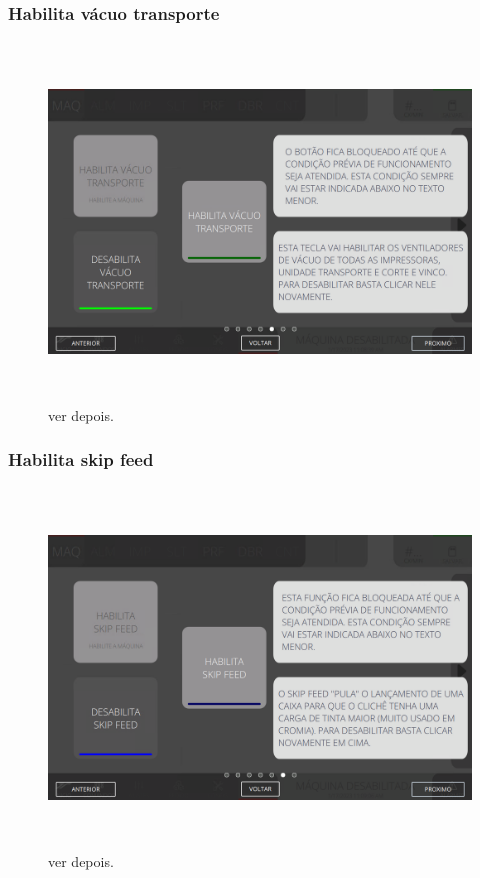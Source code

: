 \vspace*{\fill}

\newpage
\thispagestyle{fancy}

\vspace*{\fill}

\subsubsection{\small{Habilita vácuo transporte}}

\begin{figure}[h]
  \centering
  \includegraphics[width=576px,height=360px]{src/imagesFlexo/02-machine/e-5.png}
  \caption{ver depois.}
   \label{}
\end{figure}

\vspace*{\fill}

\newpage
\thispagestyle{fancy}

\vspace*{\fill}

\subsubsection{\small{Habilita skip feed}}

\begin{figure}[h]
  \centering
  \includegraphics[width=576px,height=360px]{src/imagesFlexo/02-machine/e-6.png}
  \caption{ver depois.}
   \label{}
\end{figure}

